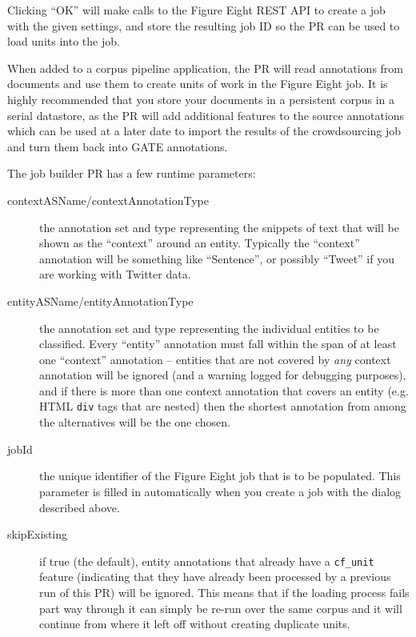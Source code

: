 Clicking ``OK'' will make calls to the Figure Eight REST API to create a job
with the given settings, and store the resulting job ID so the PR can be used
to load units into the job.


When added to a corpus pipeline application, the PR will read annotations from
documents and use them to create units of work in the Figure Eight job.  It is
highly recommended that you store your documents in a persistent corpus in a
serial datastore, as the PR will add additional features to the source
annotations which can be used at a later date to import the results of the
crowdsourcing job and turn them back into GATE annotations.

The job builder PR has a few runtime parameters:
\begin{description}
\item[contextASName/contextAnnotationType] the annotation set and type
  representing the snippets of text that will be shown as the ``context''
  around an entity.  Typically the ``context'' annotation will be something
  like ``Sentence'', or possibly ``Tweet'' if you are working with Twitter
  data.
\item[entityASName/entityAnnotationType] the annotation set and type
  representing the individual entities to be classified.  Every ``entity''
  annotation must fall within the span of at least one ``context'' annotation --
  entities that are not covered by \emph{any} context annotation will be
  ignored (and a warning logged for debugging purposes), and if there is more
  than one context annotation that covers an entity (e.g. HTML \verb!div! tags
  that are nested) then the shortest annotation from among the alternatives
  will be the one chosen.
\item[jobId] the unique identifier of the Figure Eight job that is to be
  populated.  This parameter is filled in automatically when you create a job
  with the dialog described above.
\item[skipExisting] if true (the default), entity annotations that already have
  a \verb!cf_unit! feature (indicating that they have already been processed by a
  previous run of this PR) will be ignored.  This means that if the loading
  process fails part way through it can simply be re-run over the same corpus
  and it will continue from where it left off without creating duplicate units.
\end{description}

